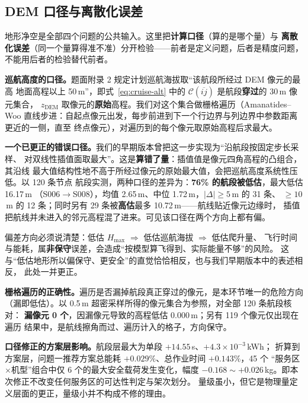 \subsection{DEM 口径与离散化误差}
\label{sec:dem-caliber}

地形净空是全部四个问题的公共输入。这里把\textbf{计算口径}（算的是哪个量）与
\textbf{离散化误差}（同一个量算得准不准）分开检验——前者是定义问题，后者是精度问题，
不能用后者的检验替代前者。

\textbf{巡航高度的口径。}题面附录 2 规定计划巡航海拔取“该航段所经过 DEM 像元的最高
地面高程以上 50\,m”，即式~\eqref{eq:cruise-alt} 中的
$\mathcal{C}(\overline{ij})$ 是航段\textbf{穿过}的 30\,m 像元集合，
$z_{\mathrm{DEM}}$ 取像元的\textbf{原始}高程。我们对这个集合做栅格遍历（Amanatides--Woo
直线步进：自起点像元出发，每步前进到下一个行边界与列边界中参数距离更近的一侧，直至
终点像元），对遍历到的每个像元取原始高程后求最大。

\textbf{一个已更正的错误口径。}我们的早期版本曾把这一步实现为“沿航段按固定步长采样、
对双线性插值面取最大”。这是\textbf{算错了量}：插值值是像元四角高程的凸组合，其沿线
最大值结构性地不高于所经过像元的原始最大值，会把巡航高度系统性压低。以 120 条节点
航段实测，两种口径的差异为：\textbf{76\% 的航段被低估}，最大低估 16.17\,m
（S006$\to$S008），均值 2.65\,m、中位 1.72\,m，$|\Delta|\ge5$\,m 的 31 条、
$\ge10$\,m 的 12 条；同时另有 29 条被\textbf{高估}最多 10.72\,m——航线贴近像元边缘时，
插值把航线并未进入的邻元高程混了进来。可见该口径在两个方向上都有偏。

偏差方向必须说清楚：低估 $H_{\max}$ $\Rightarrow$ 低估巡航海拔 $\Rightarrow$ 低估爬升量、
飞行时间与能耗，属\textbf{非保守}误差，会造成“按模型算飞得到、实际能量不够”的风险。
这与“低估地形所以偏保守、更安全”的直觉恰恰相反，也与我们早期版本中的表述相反，
此处一并更正。

\textbf{栅格遍历的正确性。}遍历是否漏掉航段真正穿过的像元，是本环节唯一的危险方向
（漏即低估）。以 0.5\,m 超密采样所得的像元集合为参照，对全部 120 条航段核对：
\textbf{漏像元 0 个}，因漏像元导致的高程低估 0.000\,m；另有 119 个像元仅出现在遍历
结果中，是航线擦角而过、遍历计入的格子，方向保守。

\textbf{口径修正的方案层影响。}航段层最大为单段 $+14.55$\,s、$+4.3\times10^{-3}$\,kWh；
折算到方案层，问题一推荐方案总能耗 $+0.029\%$、总作业时间 $+0.143\%$，45 个
“服务区$\times$机型”组合中仅 6 个的最大安全载荷发生变化，幅度
$-0.168\sim+0.026$\,kg。即本次修正不改变任何服务区的可达性判定与架次划分。
量级虽小，但它是物理量定义层面的更正，量级小并不构成不修的理由。

